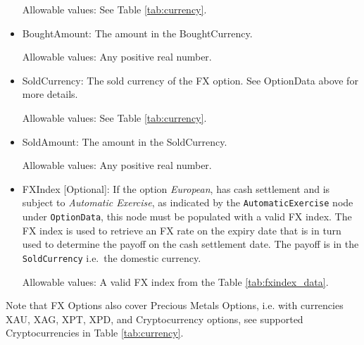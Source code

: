 \begin{itemize}
Allowable values: See Table \ref{tab:currency}.

\item BoughtAmount: The amount in the BoughtCurrency.

Allowable values: Any positive real number.

\item SoldCurrency: The sold currency of the FX option. See OptionData above for more details.

Allowable values: See Table \ref{tab:currency}.

\item SoldAmount: The amount in the SoldCurrency.

Allowable values: Any positive real number.

\item FXIndex [Optional]: If the option \textit{European}, has cash settlement and is subject to \textit{Automatic Exercise}, as indicated by the \lstinline!AutomaticExercise! node under \lstinline!OptionData!, this node must be populated with a valid FX index. The FX index is used to retrieve an FX rate on the expiry date that is in turn used to determine the payoff on the cash settlement date. The payoff is in the \lstinline!SoldCurrency! i.e.\ the domestic currency.

Allowable values: A valid FX index from the Table \ref{tab:fxindex_data}.

\end{itemize}

Note that FX Options also cover Precious Metals Options, i.e. with currencies XAU, XAG, XPT, XPD, and Cryptocurrency options,  see supported Cryptocurrencies in Table \ref{tab:currency}.